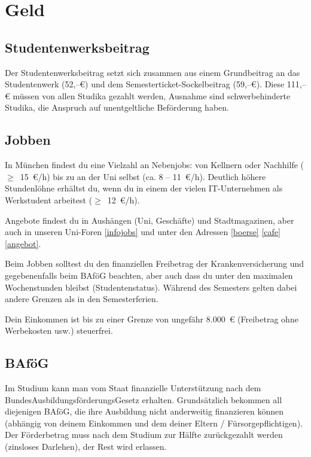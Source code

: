 ﻿\chapter{Geld}

\section{Studentenwerksbeitrag}
Der Studentenwerksbeitrag setzt sich zusammen aus einem Grundbeitrag an das Studentenwerk (52,--€) und dem
Semesterticket-Sockelbeitrag (59,--€).
Diese 111,--€ müssen von allen Studika gezahlt werden, Ausnahme sind schwerbehinderte Studika, die Anspruch
auf unentgeltliche Beförderung haben.

\section{Jobben}
In München findest du eine Vielzahl an Nebenjobs: von Kellnern oder Nachhilfe ($\geq$~15~€/h) bis zu an der Uni selbst (ca. 8 -- 11~€/h). Deutlich höhere Stundenlöhne erhältst du, wenn du in einem der vielen IT-Unternehmen als Werkstudent arbeitest ($\geq$~12~€/h).

Angebote findest du in Aushängen (Uni, Geschäfte) und Stadtmagazinen, aber auch in unseren Uni-Foren \ref{infojobs} und unter den Adressen
\ref{boerse} \ref{cafe} \ref{angebot}.

Beim Jobben solltest du den finanziellen Freibetrag der Krankenversicherung und gegebenenfalls beim BAföG beachten, aber auch dass du unter den maximalen Wochenstunden bleibst (Studentenstatus). Während des Semesters gelten dabei andere Grenzen als in den Semesterferien.

Dein Einkommen ist bis zu einer Grenze von ungefähr 8.000~€ (Freibetrag ohne Werbekosten usw.) steuerfrei.

\begin{urlList}
\end{urlList}


\section{BAföG}
Im Studium kann man vom Staat finanzielle Unterstützung nach dem BundesAusbildungsförderungsGesetz erhalten. Grundsätzlich bekommen all diejenigen BAföG, die ihre Ausbildung nicht anderweitig finanzieren können (abhängig von deinem Einkommen und dem deiner Eltern / Fürsorgepflichtigen). Der Förderbetrag muss nach dem Studium zur Hälfte zurückgezahlt werden (zinsloses Darlehen), der Rest wird erlassen.

